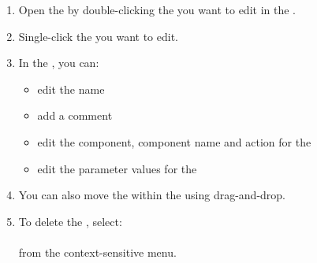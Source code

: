 
\begin{enumerate}
\item Open the \gdtestcaseeditor{} by double-clicking the \gdcase{} you want to edit in the \gdtestcasebrowser{}.  
\item Single-click the \gdstep{} you want to edit. 
\item In the \gdpropview{}, you can:
\begin{itemize}
\item edit the \gdstep{} name
\item add a comment
\item edit the component, component name and action for the \gdstep{} 
\item edit the parameter values for the \gdstep{} 
\end{itemize}
\item You can also move the \gdstep{} within the \gdcase{} using drag-and-drop. 
\item To delete the \gdstep{}, select:\\
\\
from the context-sensitive menu. 
\end{enumerate}








